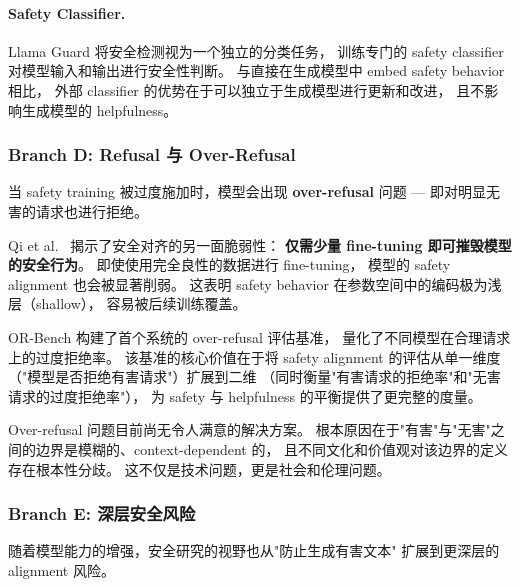 \paragraph{Safety Classifier.}
Llama Guard \cite{inan2023llamaguard} 将安全检测视为一个独立的分类任务，
训练专门的 safety classifier 对模型输入和输出进行安全性判断。
与直接在生成模型中 embed safety behavior 相比，
外部 classifier 的优势在于可以独立于生成模型进行更新和改进，
且不影响生成模型的 helpfulness。

\subsubsection{Branch D: Refusal 与 Over-Refusal}
\label{sec:t3-refusal}

当 safety training 被过度施加时，模型会出现 \textbf{over-refusal} 问题 ---
即对明显无害的请求也进行拒绝。

Qi et al.\ \cite{qi2023finetuning} 揭示了安全对齐的另一面脆弱性：
\textbf{仅需少量 fine-tuning 即可摧毁模型的安全行为}。
即使使用完全良性的数据进行 fine-tuning，
模型的 safety alignment 也会被显著削弱。
这表明 safety behavior 在参数空间中的编码极为浅层（shallow），
容易被后续训练覆盖。

OR-Bench \cite{cui2024orbench} 构建了首个系统的 over-refusal 评估基准，
量化了不同模型在合理请求上的过度拒绝率。
该基准的核心价值在于将 safety alignment 的评估从单一维度
（"模型是否拒绝有害请求"）扩展到二维
（同时衡量"有害请求的拒绝率"和"无害请求的过度拒绝率"），
为 safety 与 helpfulness 的平衡提供了更完整的度量。

\begin{openproblembox}
Over-refusal 问题目前尚无令人满意的解决方案。
根本原因在于"有害"与"无害"之间的边界是模糊的、context-dependent 的，
且不同文化和价值观对该边界的定义存在根本性分歧。
这不仅是技术问题，更是社会和伦理问题。
\end{openproblembox}

\subsubsection{Branch E: 深层安全风险}
\label{sec:t3-deepsafety}

随着模型能力的增强，安全研究的视野也从"防止生成有害文本"
扩展到更深层的 alignment 风险。

